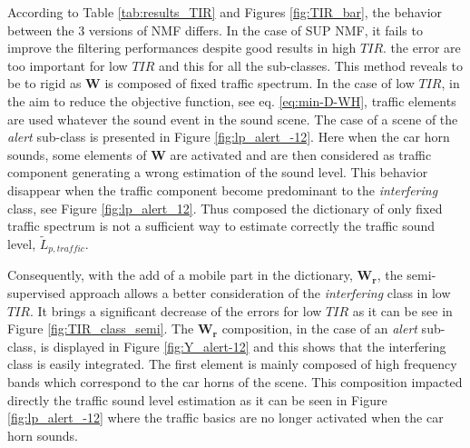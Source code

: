 \documentclass[twocolumn,a4paper,10pt]{article}
\begin{document}
According to Table \ref{tab:results_TIR} and Figures \ref{fig:TIR_bar}, the behavior between the 3 versions of NMF differs. In the case of SUP NMF, it fails to improve the filtering performances despite good results in high $TIR$.  the error are too important for low $TIR$ and this for all the sub-classes. This method reveals to be to rigid as $\mathbf{W}$ is composed of fixed traffic spectrum. In the case of low $TIR$, in the aim to reduce the objective function, see eq. \ref{eq:min-D-WH}, traffic elements are used whatever the sound event in the  sound scene. The case of a scene of the \textit{alert} sub-class is presented in Figure \ref{fig:lp_alert_-12}. Here when the car horn sounds, some elements of $\mathbf{W}$ are activated and are then considered as traffic component generating a wrong estimation of the sound level. This behavior disappear when the traffic component become predominant to the \textit{interfering} class, see Figure \ref{fig:lp_alert_12}. Thus composed the dictionary of only fixed traffic spectrum is not a sufficient way to estimate correctly the traffic sound level, $\tilde{L}_{p,traffic}$.

Consequently, with the add of a mobile part in the dictionary, $\mathbf{W_r}$, the semi-supervised approach  allows a better consideration of the \textit{interfering} class in low $TIR$. It brings a significant decrease of the errors for low $TIR$ as it can be see in Figure \ref{fig:TIR_class_semi}. The $\mathbf{W_r}$ composition, in the case of an \textit{alert} sub-class, is displayed in Figure \ref{fig:Y_alert-12} and this shows that the interfering class is easily integrated. The first element is mainly composed of high frequency bands which correspond to the car horns of the scene. This composition impacted directly the traffic sound level estimation as it can be seen in Figure \ref{fig:lp_alert_-12} where the traffic basics are no longer activated when the car horn sounds.
\end{document}

